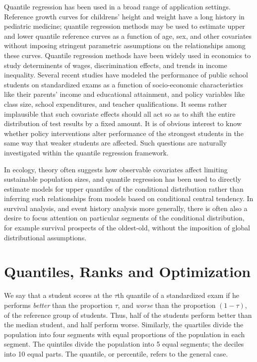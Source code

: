 \documentclass{amsart}
\begin{document}
Quantile regression has been used in a broad range of application settings.
Reference growth curves for childrens' height and weight have a long history
in pediatric medicine; quantile regression methods may be used to estimate
upper and lower quantile reference curves as a function of age, sex, and
other covariates without imposing stringent parametric assumptions on the
relationships among these curves.  Quantile regression methods have been
widely used in economics to study determinents of wages, discrimination
effects, and trends in income inequality.  
Several recent studies have modeled the performance of public school
students on standardized exams as a function of socio-economic characteristics
like their parents' income and educational attainment, and policy variables 
like class size, school expenditures, and teacher qualifications.  It seems
rather implausible that such covariate effects should all act so as to
shift the entire distribution of test results by a fixed amount.
It is of obvious interest to know whether policy interventions alter
performance of the strongest students in the same way that weaker students
are affected.  Such questions are naturally investigated within the quantile
regression framework.  

In ecology, theory often suggests
how observable covariates affect limiting sustainable population sizes, and
quantile regression has been used to directly estimate models for upper 
quantiles of the conditional distribution rather than inferring such
relationships from models based on conditional central tendency.  In
survival analysis, and event history analysis more generally, there is
often also a desire to focus attention on particular segments of the
conditional distribution, for example survival prospects of the oldest-old,
without the imposition of global distributional assumptions.  



\section{Quantiles, Ranks and Optimization}

We say that a student scores at the $\tau$th quantile
of a standardized exam if he performs {\it better} than the proportion $\tau$, 
and {\it worse} than the proportion $(1-\tau)$, 
of the reference group of students.
Thus, half of the students perform better than the median student, and half
perform worse.  Similarly, the quartiles divide the population into four 
segments with equal proportions of the population in each segment.  
The quintiles divide the population into 5 equal segments; the deciles
into 10 equal parts.  The quantile, or percentile, refers to the general case.
\end{document}

